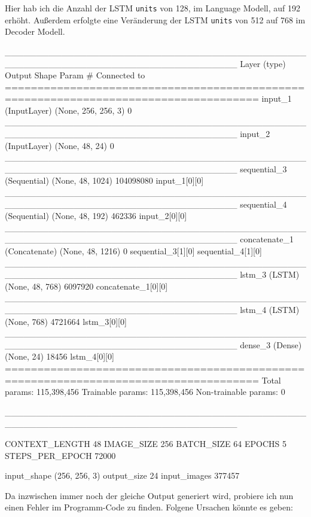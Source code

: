 \documentclass[pdftex,a4paper,halfparskip]{scrartcl}
\begin{document}
Hier hab ich die Anzahl der LSTM \texttt{units} von 128, im Language Modell, auf 192 erhöht. Außerdem erfolgte eine Veränderung der LSTM \texttt{units} von 512 auf 768 im Decoder Modell.

\begin{spverbatim}

_____________________________________________________________________________________
Layer (type)                    Output Shape         Param #     Connected to
=====================================================================================
input_1 (InputLayer)            (None, 256, 256, 3)  0
_____________________________________________________________________________________
input_2 (InputLayer)            (None, 48, 24)       0
_____________________________________________________________________________________
sequential_3 (Sequential)       (None, 48, 1024)     104098080   input_1[0][0]
_____________________________________________________________________________________
sequential_4 (Sequential)       (None, 48, 192)      462336      input_2[0][0]
_____________________________________________________________________________________
concatenate_1 (Concatenate)     (None, 48, 1216)     0           sequential_3[1][0]
                                                                 sequential_4[1][0]
_____________________________________________________________________________________
lstm_3 (LSTM)                   (None, 48, 768)      6097920     concatenate_1[0][0]
_____________________________________________________________________________________
lstm_4 (LSTM)                   (None, 768)          4721664     lstm_3[0][0]
_____________________________________________________________________________________
dense_3 (Dense)                 (None, 24)           18456       lstm_4[0][0]
=====================================================================================
Total params: 115,398,456
Trainable params: 115,398,456
Non-trainable params: 0

_____________________________________________________________________________________

CONTEXT_LENGTH 48
IMAGE_SIZE 256
BATCH_SIZE 64
EPOCHS 5
STEPS_PER_EPOCH 72000

input_shape (256, 256, 3)
output_size 24
input_images 377457

\end{spverbatim}

Da inzwischen immer noch der gleiche Output generiert wird, probiere ich nun einen Fehler im Programm-Code zu finden. Folgene Ursachen könnte es geben:
\end{document}
